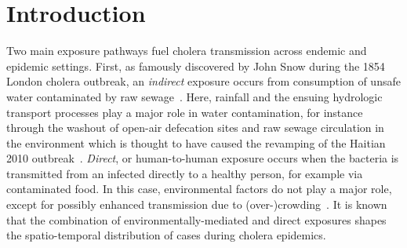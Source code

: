 \section{Introduction}
\label{sec:intro}
Two main exposure pathways fuel cholera transmission across endemic and epidemic settings.
First, as famously discovered by John Snow during the 1854 London cholera outbreak, an \textit{indirect} exposure occurs from consumption of unsafe water contaminated by raw sewage~\cite{snowModeCommunicationCholera1855,dehning_inferring_2020,:AskHNWhat:}. Here, rainfall and the ensuing hydrologic transport processes play a major role in water contamination, for instance through the washout of open-air defecation sites and raw sewage circulation in the environment which is thought to have caused the revamping of the Haitian 2010 outbreak~\cite{Rinaldo:Reassessment20102011:2012}. 
\textit{Direct}, or human-to-human exposure occurs when the bacteria is transmitted from an infected directly to a healthy person, for example via contaminated food. In this case, environmental factors do not play a major role, except for possibly enhanced transmission due to (over-)crowding~\cite{boeleeOptionsWaterStorage2013,fingerMobilePhoneData2016}.
It is known that the combination of environmentally-mediated and direct exposures shapes the spatio-temporal distribution of cases during cholera epidemics\cite{sugimotoHouseholdTransmissionVibrio2014,biMicroscaleSpatialClustering2016,lesslerMeasuringSpatialDependence2016,rinaldoModelingKeyDrivers2017}.
